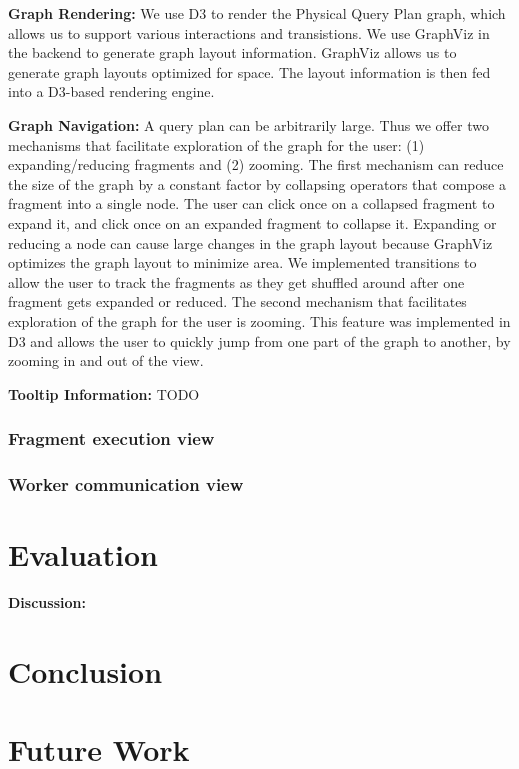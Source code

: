 \documentclass{chi2009}
\newcommand*{\graph}{Physical Query Plan\xspace}
\begin{document}
\textbf{Graph Rendering:} We use D3 to render the \graph graph, which allows us to support various interactions and transistions. We use GraphViz \cite{graphviz} in the backend to generate graph layout information. GraphViz allows us to generate graph layouts optimized for space. The layout information is then fed into a D3-based rendering engine. 

\textbf{Graph Navigation:} A query plan can be arbitrarily large. Thus we offer two mechanisms that facilitate exploration of the graph for the user: (1) expanding/reducing fragments and (2) zooming. The first mechanism can reduce the size of the graph by a constant factor by collapsing operators that compose a fragment into a single node. The user can click once on a collapsed fragment to expand it, and click once on an expanded fragment to collapse it. Expanding or reducing a node can cause large changes in the graph layout because GraphViz optimizes the graph layout to minimize area. We implemented transitions to allow the user to track the fragments as they get shuffled around after one fragment gets expanded or reduced. The second mechanism that facilitates exploration of the graph for the user is zooming. This feature was implemented in D3 and allows the user to quickly jump from one part of the graph to another, by zooming in and out of the view.

\textbf{Tooltip Information:} TODO


\subsubsection{Fragment execution view}



\subsubsection{Worker communication view}


\section{Evaluation}



\textbf{Discussion:}

\section{Conclusion}


\section{Future Work}




\end{document}
